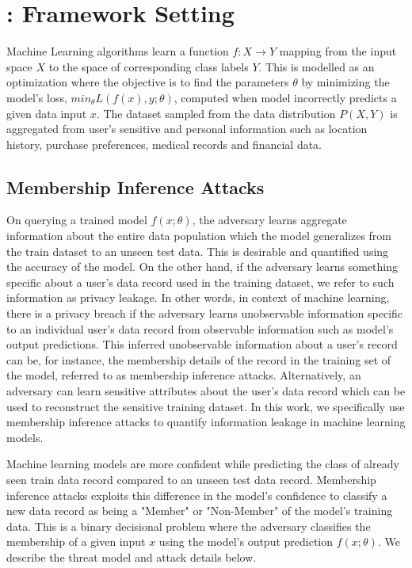 \section{\method: Framework Setting}\label{background}

Machine Learning algorithms learn a function $f:X \rightarrow Y$ mapping from the input space $X$ to the space of corresponding class labels $Y$.
This is modelled as an optimization where the objective is to find the parameters $\theta$ by minimizing the model's loss, $min_{\theta} L(f(x),y;\theta)$, computed when model incorrectly predicts a given data input $x$.
The dataset sampled from the data distribution $P(X,Y)$ is aggregated from user's sensitive and personal information such as location history, purchase preferences, medical records and financial data.


\subsection{Membership Inference Attacks}


On querying a trained model $f(x;\theta)$, the adversary learns aggregate information about the entire data population which the model generalizes from the train dataset to an unseen test data.
This is desirable and quantified using the accuracy of the model.
On the other hand, if the adversary learns something specific about a user's data record used in the training dataset, we refer to such information as privacy leakage.
In other words, in context of machine learning, there is a privacy breach if the adversary learns unobservable information specific to an individual user's data record from observable information such as model's output predictions.
This inferred unobservable information about a user's record can be, for instance, the membership details of the record in the training set of the model, referred to as membership inference attacks.
Alternatively, an adversary can learn sensitive attributes about the user's data record which can be used to reconstruct the sensitive training dataset.
In this work, we specifically use membership inference attacks to quantify information leakage in machine learning models.

Machine learning models are more confident while predicting the class of already seen train data record compared to an unseen test data record.
Membership inference attacks exploits this difference in the model's confidence to classify a new data record as being a "Member" or "Non-Member" of the model's training data.
This is a binary decisional problem where the adversary classifies the membership of a given input $x$ using the model's output prediction $f(x;\theta)$.
We describe the threat model and attack details below.

